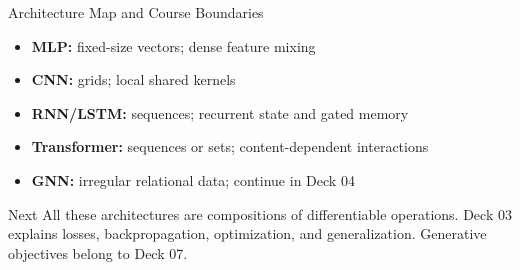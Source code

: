 \documentclass[10pt,aspectratio=169]{ntuabeamer}
\begin{document}
\begin{frame}{Architecture Map and Course Boundaries}
  \begin{itemize}
    \item \textcolor{softblue}{\textbf{MLP:}} fixed-size vectors; dense feature mixing
    \item \textcolor{softteal}{\textbf{CNN:}} grids; local shared kernels
    \item \textcolor{softgold}{\textbf{RNN/LSTM:}} sequences; recurrent state and gated memory
    \item \textcolor{softpurple}{\textbf{Transformer:}} sequences or sets; content-dependent interactions
    \item \textcolor{softcoral}{\textbf{GNN:}} irregular relational data; continue in Deck 04
  \end{itemize}
  \begin{block}{Next}
    All these architectures are compositions of differentiable operations. Deck 03 explains losses, backpropagation, optimization, and generalization. Generative objectives belong to Deck 07.
  \end{block}
\end{frame}
\end{document}
